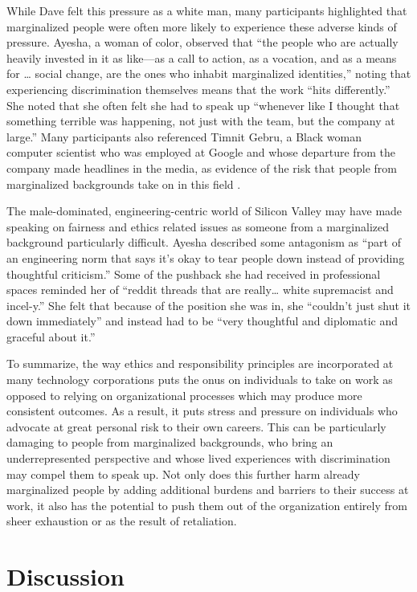 \documentclass[sigconf]{acmart}
\begin{document}
While Dave felt this pressure as a white man, many participants highlighted that marginalized people were often more likely to experience these adverse kinds of pressure. Ayesha, a woman of color, observed that “the people who are actually heavily invested in it as like---as a call to action, as a vocation, and as a means for … social change, are the ones who inhabit marginalized identities,” noting that experiencing discrimination themselves means that the work “hits differently.” She noted that she often felt she had to speak up “whenever like I thought that something terrible was happening, not just with the team, but the company at large.” Many participants also referenced Timnit Gebru, a Black woman computer scientist who was employed at Google and whose departure from the company made headlines in the media, as evidence of the risk that people from marginalized backgrounds take on in this field \cite{wong_more_2020}.

The male-dominated, engineering-centric world of Silicon Valley may have made speaking on fairness and ethics related issues as someone from a marginalized background particularly difficult. Ayesha described some antagonism as “part of an engineering norm that says it’s okay to tear people down instead of providing thoughtful criticism.” Some of the pushback she had received in professional spaces reminded her of “reddit threads that are really… white supremacist and incel-y.” She felt that because of the position she was in, she “couldn’t just shut it down immediately” and instead had to be “very thoughtful and diplomatic and graceful about it.”

To summarize, the way ethics and responsibility principles are incorporated at many technology corporations puts the onus on individuals to take on work as opposed to relying on organizational processes which may produce more consistent outcomes. As a result, it puts stress and pressure on individuals who advocate at great personal risk to their own careers. This can be particularly damaging to people from marginalized backgrounds, who bring an underrepresented perspective and whose lived experiences with discrimination may compel them to speak up. Not only does this further harm already marginalized people by adding additional burdens and barriers to their success at work, it also has the potential to push them out of the organization entirely from sheer exhaustion or as the result of retaliation.

\section{Discussion}
\end{document}
